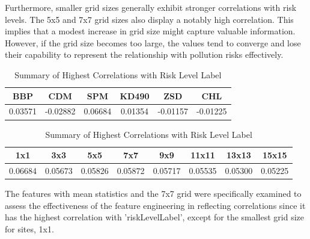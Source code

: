 \documentclass[a4paper,11pt]{report}
\begin{document}
Furthermore, smaller grid sizes generally exhibit stronger correlations with risk levels. The 5x5 and 7x7 grid sizes also display a notably high correlation. This implies that a modest increase in grid size might capture valuable information. However, if the grid size becomes too large, the values tend to converge and lose their capability to represent the relationship with pollution risks effectively.

\begin{table}[h]
\centering
\begin{subtable}[c]{\textwidth}
\centering
\begin{tabular}{cccccc}
\toprule
\textbf{BBP} & \textbf{CDM} & \textbf{SPM} & \textbf{KD490} & \textbf{ZSD} & \textbf{CHL} \\ \midrule
 0.03571 & -0.02882 & 0.06684 & 0.01354 & -0.01157 & -0.01225 \\ \bottomrule
\end{tabular}
\caption{Correlations by Feature}
\label{tab:feature_corrs}
\end{subtable}
 
\vspace{5mm}           

\begin{subtable}[c]{\textwidth}
\centering
\begin{tabular}{cccccccc}
\toprule
\textbf{1x1} & \textbf{3x3} & \textbf{5x5} & \textbf{7x7} & \textbf{9x9} & \textbf{11x11} & \textbf{13x13} & \textbf{15x15} \\ \midrule
0.06684 & 0.05673 & 0.05826 & 0.05872 & 0.05717 & 0.05535 & 0.05300 & 0.05225 \\ \bottomrule
\end{tabular}
\caption{Correlations by Grid Size}
\label{tab:gridsize_corrs}
\end{subtable}

\caption{Summary of Highest Correlations with Risk Level Label}
\label{table:combined_corrs}
\end{table}

The features with mean statistics and the 7x7 grid were specifically examined to assess the effectiveness of the feature engineering in reflecting correlations since it has the highest correlation with 'riskLevelLabel', except for the smallest grid size for sites, 1x1.
\end{document}
